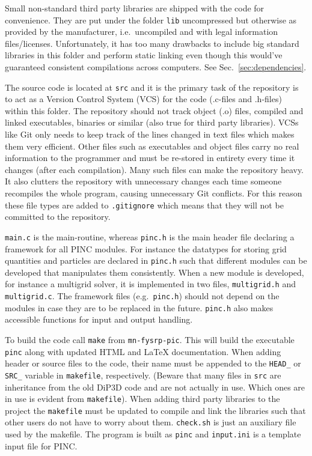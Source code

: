 \documentclass[10pt,a4paper]{article}
\newcommand{\refsec}[1]{Sec.~\ref{sec:#1}}
\begin{document}
Small non-standard third party libraries are shipped with the code for convenience. They are put under the folder \verb$lib$ uncompressed but otherwise as provided by the manufacturer, i.e.\ uncompiled and with legal information files/licenses. Unfortunately, it has too many drawbacks to include big standard libraries in this folder and perform static linking even though this would've guaranteed consistent compilations across computers. See \refsec{dependencies}.

The source code is located at \verb$src$ and it is the primary task of the repository is to act as a Version Control System (VCS) for the code (.c-files and .h-files) within this folder. The repository should not track object (.o) files, compiled and linked executables, binaries or similar (also true for third party libraries). VCSs like Git only needs to keep track of the lines changed in text files which makes them very efficient. Other files such as executables and object files carry no real information to the programmer and must be re-stored in entirety every time it changes (after each compilation). Many such files can make the repository heavy. It also clutters the repository with unnecessary changes each time someone recompiles the whole program, causing unnecessary Git conflicts. For this reason these file types are added to \verb$.gitignore$ which means that they will not be committed to the repository.

\verb$main.c$ is the main-routine, whereas \verb$pinc.h$ is the main header file declaring a framework for all PINC modules. For instance the datatypes for storing grid quantities and particles are declared in \verb$pinc.h$ such that different modules can be developed that manipulates them consistently. When a new module is developed, for instance a multigrid solver, it is implemented in two files, \verb$multigrid.h$ and \verb$multigrid.c$. The framework files (e.g.\ \verb$pinc.h$) should not depend on the modules in case they are to be replaced in the future. \verb$pinc.h$ also makes accessible functions for input and output handling.

To build the code call \verb$make$ from \verb$mn-fysrp-pic$. This will build the executable \verb$pinc$ along with updated HTML and \LaTeX{} documentation. When adding header or source files to the code, their name must be appended to the \verb$HEAD_$ or \verb$SRC_$ variable in \verb$makefile$, respectively. (Beware that many files in \verb$src$ are inheritance from the old DiP3D code and are not actually in use. Which ones are in use is evident from \verb$makefile$). When adding third party libraries to the project the \verb$makefile$ must be updated to compile and link the libraries such that other users do not have to worry about them. \verb$check.sh$ is just an auxiliary file used by the makefile. The program is built as \verb$pinc$ and \verb$input.ini$ is a template input file for PINC.
\end{document}
